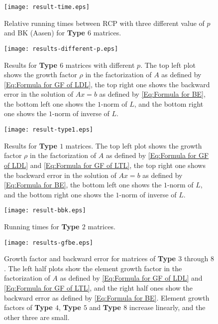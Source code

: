 \documentclass[11pt]{article}
\begin{document}
\begin{figure}[htbp]
\centering
\texttt{[image: result-time.eps]}
\caption{Relative running times between RCP with three different value of $p$ and BK (Aasen)  for {\bf Type $6$} matrices.}\label{Fig:Relative run time between RCP and BK}
\end{figure}

\begin{figure}[htbp]
\centering
\texttt{[image: results-different-p.eps]}
\caption{Results for {\bf Type $6$} matrices with different $p$. The top left plot shows the growth factor $\rho$ in the factorization of $A$ as defined by \eqref{Eq:Formula for GF of LDL}, the top right one shows the backward error in the solution of $Ax=b$ as defined by \eqref{Eq:Formula for BE}, the bottom left one shows the $1$-norm of $L$, and the bottom right one shows the $1$-norm of inverse of $L$.}\label{Fig:Four factors for random matrices with different p}
\end{figure}

\begin{figure}[htbp]
\centering
\texttt{[image: result-type1.eps]}
\caption{Results for {\bf Type $1$} matrices. The top left plot shows the growth factor $\rho$ in the factorization of $A$ as defined by \eqref{Eq:Formula for GF of LDL} and \eqref{Eq:Formula for GF of LTL}, the top right one shows the backward error in the solution of $Ax=b$ as defined by \eqref{Eq:Formula for BE}, the bottom left one shows the $1$-norm of $L$, and the bottom right one shows the $1$-norm of inverse of $L$.}\label{Fig:worst case growth factor for BK}
\end{figure}

\begin{figure}[htbp]
\centering
\texttt{[image: result-bbk.eps]}
\caption{Running times for {\bf Type  $2$} matrices.}\label{Fig:Running time of the worst case for BBK}
\end{figure}


\begin{figure}[htbp]
\centering
\texttt{[image: results-gfbe.eps]}
\caption{Growth factor and backward error for matrices of {\bf Type $3$} through {\bf $8$}. The left half plots show the element growth factor in the factorization of $A$ as defined by \eqref{Eq:Formula for GF of LDL} and \eqref{Eq:Formula for GF of LTL}, and the right half ones show the backward error as defined by \eqref{Eq:Formula for BE}. Element growth factors of {\bf Type $4$}, {\bf Type $5$} and {\bf Type $8$} increase linearly, and the other three are small.}\label{Fig:results of element growth factor}
\end{figure}
\end{document}
